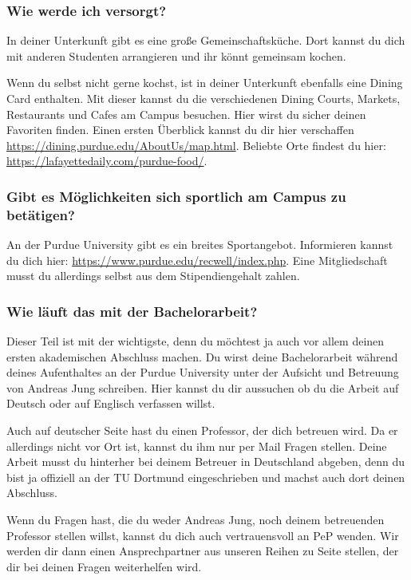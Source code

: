 \documentclass[
  paper=a4,
  fontsize=12pt,
  DIV=16,
  headheight=52pt,
  footheight=45pt,
  headinclude,
  parskip=full,
]{scrartcl}
\begin{document}
\subsubsection*{Wie werde ich versorgt?}
In deiner Unterkunft gibt es eine große Gemeinschaftsküche.
Dort kannst du dich mit anderen Studenten arrangieren und ihr könnt gemeinsam kochen.

Wenn du selbst nicht gerne kochst, ist in deiner Unterkunft ebenfalls eine
Dining Card enthalten.
Mit dieser kannst du die verschiedenen Dining Courts, Markets, Restaurants und Cafes am Campus besuchen.
Hier wirst du sicher deinen Favoriten finden.
Einen ersten Überblick kannst du dir hier verschaffen \url{https://dining.purdue.edu/AboutUs/map.html}.
Beliebte Orte findest du hier: \url{https://lafayettedaily.com/purdue-food/}.

\subsubsection*{Gibt es Möglichkeiten sich sportlich am Campus zu betätigen?}
An der Purdue University gibt es ein breites Sportangebot.
Informieren kannst du dich hier: \url{https://www.purdue.edu/recwell/index.php}.
Eine Mitgliedschaft musst du allerdings selbst aus dem Stipendiengehalt zahlen.

\subsubsection*{Wie läuft das mit der Bachelorarbeit?}
Dieser Teil ist mit der wichtigste, denn du möchtest ja auch vor allem deinen ersten akademischen Abschluss machen.
Du wirst deine Bachelorarbeit während deines Aufenthaltes an der Purdue University unter der Aufsicht und Betreuung von Andreas Jung schreiben.
Hier kannst du dir aussuchen ob du die Arbeit auf Deutsch oder auf Englisch verfassen willst.

Auch auf deutscher Seite hast du einen Professor, der dich betreuen wird.
Da er allerdings nicht vor Ort ist, kannst du ihm nur per Mail Fragen stellen.
Deine Arbeit musst du hinterher bei deinem Betreuer in Deutschland abgeben, denn du bist ja offiziell an der TU Dortmund eingeschrieben und machst auch dort deinen Abschluss.

Wenn du Fragen hast, die du weder Andreas Jung, noch deinem betreuenden Professor stellen willst, kannst du dich auch vertrauensvoll an PeP wenden.
Wir werden dir dann einen Ansprechpartner aus unseren Reihen zu Seite stellen,
der dir bei deinen Fragen weiterhelfen wird.
\end{document}
